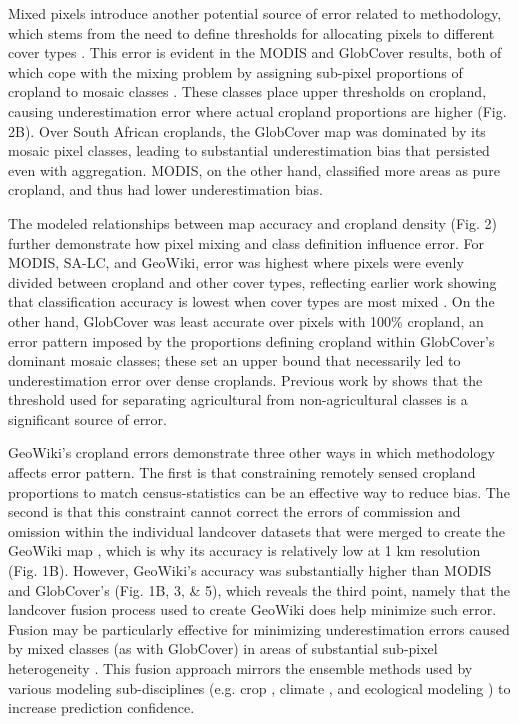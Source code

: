 \documentclass[a4paper]{article}
\begin{document}
Mixed pixels introduce another potential source of error related to methodology, which stems from the need to define thresholds for allocating pixels to different cover types \citep{ozdogan_resolution_2006}. This error is evident in the MODIS and GlobCover results, both of which cope with the mixing problem by assigning sub-pixel proportions of cropland to mosaic classes \citep{friedl_modis_2010,arino_global_2012}. These classes place upper thresholds on cropland, causing underestimation error where actual cropland proportions are higher  (Fig. 2B). Over South African croplands, the GlobCover map was dominated by its mosaic pixel classes, leading to substantial underestimation bias that persisted even with aggregation. MODIS, on the other hand, classified more areas as pure cropland, and thus had lower underestimation bias.  

The modeled relationships between map accuracy and cropland density (Fig. 2) further demonstrate how pixel mixing and class definition influence error. For MODIS, SA-LC, and GeoWiki, error was highest where pixels were evenly divided between cropland and other cover types, reflecting earlier work showing that classification accuracy is lowest when cover types are most mixed \citep{verburg_challenges_2011,gross_monitoring_2013}. On the other hand, GlobCover was least accurate over pixels with 100\% cropland, an error pattern imposed by the proportions defining cropland within GlobCover's dominant mosaic classes; these set an upper bound that necessarily led to underestimation error over dense croplands. Previous work by \citet{ozdogan_resolution_2006} shows that the threshold used for separating agricultural from non-agricultural classes is a significant source of error.   

GeoWiki's cropland errors demonstrate three other ways in which methodology affects error pattern. The first is that constraining remotely sensed cropland proportions to match census-statistics \citep{fritz_mapping_2015,fritz_highlighting_2011} can be an effective way to reduce bias. The second is that this constraint cannot correct the errors of commission and omission within the individual landcover datasets that were merged to create the GeoWiki map \citep{fritz_mapping_2015}, which is why its accuracy is relatively low at 1 km resolution (Fig. 1B). However, GeoWiki's accuracy was substantially higher than MODIS and GlobCover's (Fig. 1B, 3, \& 5), which reveals the third point, namely that the landcover fusion process used to create GeoWiki does help minimize such error.  Fusion may be particularly effective for minimizing underestimation errors caused by mixed classes (as with GlobCover) in areas of substantial sub-pixel heterogeneity \citep{fritz_mapping_2015,tuanmu_global_2014}.  This fusion approach mirrors the ensemble methods used by various modeling sub-disciplines (e.g. crop \citep{asseng_uncertainty_2013}, climate \citep{giorgi_calculation_2002}, and ecological modeling \citep{araujo_ensemble_2007}) to increase prediction confidence.
\end{document}
